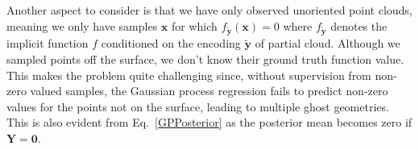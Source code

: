 Another aspect to consider is that we have only observed unoriented point clouds, meaning we only have samples $\mathbf{x}$ for which $f_{\mathbf{\tilde{y}}}(\mathbf{x}) = 0$ where $f_{\mathbf{\tilde{y}}}$ denotes the implicit function $f$ conditioned on the encoding $\mathbf{\tilde{y}}$ of partial cloud. Although we sampled points off the surface, we don't know their ground truth function value. This makes the problem quite challenging since, without supervision from non-zero valued samples, the Gaussian process regression fails to predict non-zero values for the points not on the surface, leading to multiple ghost geometries. This is also evident from Eq.~\ref{GPPosterior} as the posterior mean becomes zero if $\mathbf{Y}=\mathbf{0}$. 



